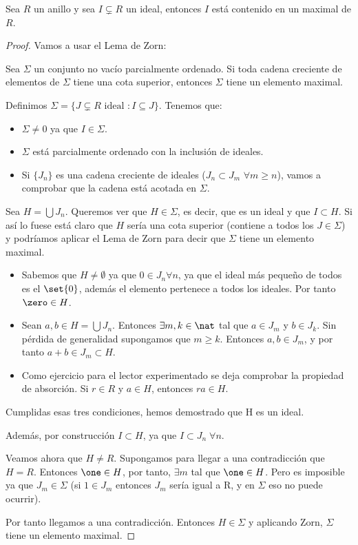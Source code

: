 \begin{theorem} \label{thm:IdealContenidoMaximal}
	Sea $R$ un anillo y sea $I \subsetneq R$ un ideal, entonces $I$ está contenido en un maximal de $R$.
\end{theorem}
\begin{proof}
Vamos a usar el Lema de Zorn:
\begin{lemma} \label{lem:Zorn}
Sea $\Sigma$ un conjunto no vacío parcialmente ordenado. Si toda cadena creciente de elementos de $\Sigma$ tiene una cota superior, entonces $\Sigma$ tiene un elemento maximal.
\end{lemma}

Definimos $\Sigma = \{J \subsetneq R \text{ ideal }: I\subseteq J \}$. Tenemos que:
\begin{itemize}
	\item $\Sigma \neq 0$ ya que $I \in \Sigma$.
	\item $\Sigma$ está parcialmente ordenado con la inclusión de ideales.
	\item Si $\{ J_n\}$ es una cadena creciente de ideales ($J_n \subset J_m$ $\forall m\geq n$), vamos a comprobar que la cadena está acotada en $\Sigma$.
\end{itemize}
Sea $H = \bigcup J_n$. Queremos ver que $H \in \Sigma$, es decir, que es un ideal y que $I \subset H$. Si así lo fuese está claro que $H$ sería una cota superior (contiene a todos los $J \in \Sigma$) y podríamos aplicar el Lema de Zorn para decir que $\Sigma$ tiene un elemento maximal.

\begin{itemize}
	\item Sabemos que $H \neq \emptyset$ ya que $0 \in J_n \forall n$, ya que el ideal más pequeño de todos es el $\set{0}$, además el elemento \zero pertenece a todos los ideales. Por tanto $\zero \in H$.
	\item Sean $a,b \in H=\bigcup J_n$.  Entonces $\exists m,k \in \nat$ tal que $a \in J_m$ y $b \in J_k$. Sin pérdida de generalidad supongamos que $m \geq k$. Entonces $a,b \in J_m$, y por tanto $a+b \in J_m \subset H$.
	\item Como ejercicio para el lector experimentado se deja comprobar la propiedad de absorción. Si $r\in R$ y $a \in H$, entonces $ra \in H$.
\end{itemize}
Cumplidas esas tres condiciones, hemos demostrado que H es un ideal.

Además, por construcción $I \subset H$, ya que $I \subset J_n \; \forall n$.

Veamos ahora que $H \neq R$. Supongamos para llegar a una contradicción que $H=R$. Entonces $\one \in H$, por tanto, $\exists m$ tal que $\one \in H$. Pero es imposible ya que $J_m \in \Sigma$ (si $1 \in J_m$ entonces $J_m$ sería igual a R, y en $\Sigma$ eso no puede ocurrir).

Por tanto llegamos a una contradicción. Entonces $H \in \Sigma$ y aplicando Zorn, $\Sigma$ tiene un elemento maximal.
\end{proof}


